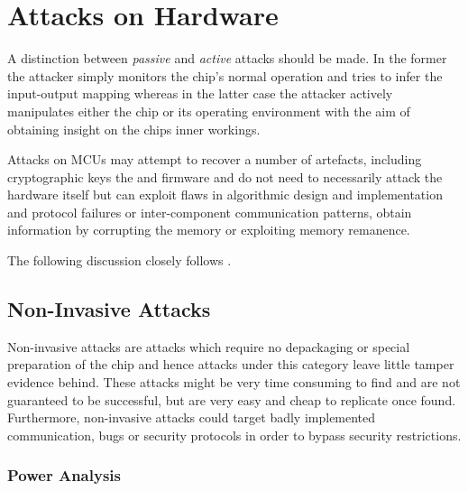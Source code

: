 \section{Attacks on Hardware}
\label{sec:curr_attacks}
A distinction between \emph{passive} and \emph{active} attacks should be made. In the former the attacker simply monitors the chip's normal operation and tries to infer the input-output mapping whereas in the latter case the attacker actively manipulates either the chip or its operating environment with the aim of obtaining insight on the chips inner workings. 

Attacks on MCUs may attempt to recover a number of artefacts, including cryptographic keys the and firmware and do not need to necessarily attack the hardware itself but can exploit flaws in algorithmic design and implementation and protocol failures or inter-component communication patterns\citep{anderson:cautionary_note}\citep{kocher:DPA}, obtain information by corrupting the memory or exploiting memory remanence\citep{sergei:thesis}\citep{gutman:memory_remanence}.

The following discussion closely follows \citep{sergei:thesis}.

	\subsection{Non-Invasive Attacks}
	Non-invasive attacks are attacks which require no depackaging or special preparation of the chip and hence attacks under this category leave little tamper evidence behind. These attacks might be very time consuming to find and are not guaranteed to be successful, but are very easy and cheap to replicate once found. Furthermore, non-invasive attacks could target badly implemented communication, bugs or security protocols in order to bypass security restrictions.
	
	\subsubsection{Power Analysis}
	
